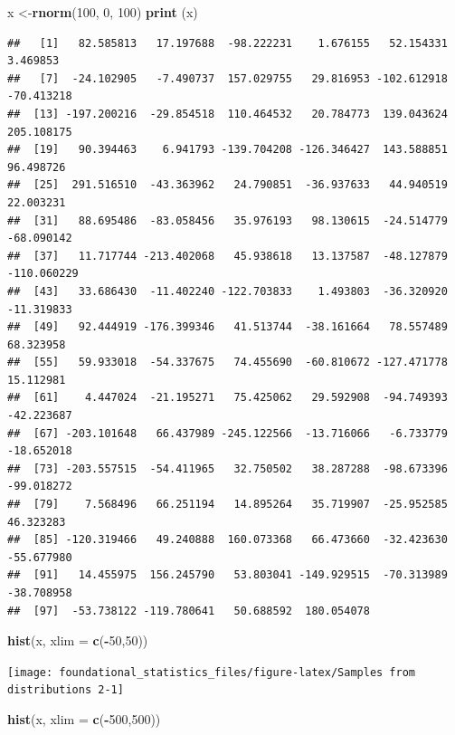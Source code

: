 \documentclass[]{book}
\newenvironment{Shaded}{\begin{snugshade}}{\end{snugshade}}
\newcommand{\DataTypeTok}[1]{\textcolor[rgb]{0.13,0.29,0.53}{#1}}
\newcommand{\DecValTok}[1]{\textcolor[rgb]{0.00,0.00,0.81}{#1}}
\newcommand{\KeywordTok}[1]{\textcolor[rgb]{0.13,0.29,0.53}{\textbf{#1}}}
\newcommand{\NormalTok}[1]{#1}
\newcommand{\OperatorTok}[1]{\textcolor[rgb]{0.81,0.36,0.00}{\textbf{#1}}}
\begin{document}
\begin{Shaded}
\begin{Highlighting}[]
\NormalTok{x <-}\KeywordTok{rnorm}\NormalTok{(}\DecValTok{100}\NormalTok{, }\DecValTok{0}\NormalTok{, }\DecValTok{100}\NormalTok{)}
\KeywordTok{print}\NormalTok{ (x)}
\end{Highlighting}
\end{Shaded}

\begin{verbatim}
##   [1]   82.585813   17.197688  -98.222231    1.676155   52.154331    3.469853
##   [7]  -24.102905   -7.490737  157.029755   29.816953 -102.612918  -70.413218
##  [13] -197.200216  -29.854518  110.464532   20.784773  139.043624  205.108175
##  [19]   90.394463    6.941793 -139.704208 -126.346427  143.588851   96.498726
##  [25]  291.516510  -43.363962   24.790851  -36.937633   44.940519   22.003231
##  [31]   88.695486  -83.058456   35.976193   98.130615  -24.514779  -68.090142
##  [37]   11.717744 -213.402068   45.938618   13.137587  -48.127879 -110.060229
##  [43]   33.686430  -11.402240 -122.703833    1.493803  -36.320920  -11.319833
##  [49]   92.444919 -176.399346   41.513744  -38.161664   78.557489   68.323958
##  [55]   59.933018  -54.337675   74.455690  -60.810672 -127.471778   15.112981
##  [61]    4.447024  -21.195271   75.425062   29.592908  -94.749393  -42.223687
##  [67] -203.101648   66.437989 -245.122566  -13.716066   -6.733779  -18.652018
##  [73] -203.557515  -54.411965   32.750502   38.287288  -98.673396  -99.018272
##  [79]    7.568496   66.251194   14.895264   35.719907  -25.952585   46.323283
##  [85] -120.319466   49.240888  160.073368   66.473660  -32.423630  -55.677980
##  [91]   14.455975  156.245790   53.803041 -149.929515  -70.313989  -38.708958
##  [97]  -53.738122 -119.780641   50.688592  180.054078
\end{verbatim}

\begin{Shaded}
\begin{Highlighting}[]
\KeywordTok{hist}\NormalTok{(x, }\DataTypeTok{xlim =} \KeywordTok{c}\NormalTok{(}\OperatorTok{-}\DecValTok{50}\NormalTok{,}\DecValTok{50}\NormalTok{))}
\end{Highlighting}
\end{Shaded}

\texttt{[image: foundational\_statistics\_files/figure-latex/Samples from distributions 2-1]}

\begin{Shaded}
\begin{Highlighting}[]
\KeywordTok{hist}\NormalTok{(x, }\DataTypeTok{xlim =} \KeywordTok{c}\NormalTok{(}\OperatorTok{-}\DecValTok{500}\NormalTok{,}\DecValTok{500}\NormalTok{))}
\end{Highlighting}
\end{Shaded}
\end{document}
